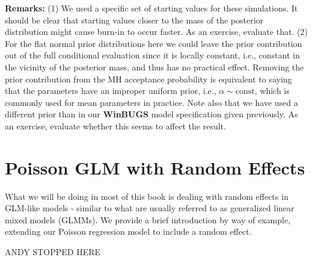 {\bf Remarks:} (1) We used a specific set of starting values for these
simulations. It should be clear that starting values closer to the
mass of the posterior distribution might cause burn-in to occur
faster. As an exercise, evaluate that.  
(2) For the flat normal prior distributions
here we could leave the prior contribution out of the full conditional
evaluation since it is locally constant, i.e., constant in the vicinity of
the posterior mass, and thus has no practical effect. Removing the
prior contribution from the MH acceptance probability is equivalent to
saying that the parameters have an improper uniform prior, i.e.,
$\alpha \sim \mbox{const}$, which is commonly used for mean parameters
in practice.
Note also that we have
used a different prior than in our {\bf WinBUGS} model specification
given previously. As an
exercise, evaluate whether this seems to affect the result.

\section{Poisson GLM with Random Effects}

What we will be doing in most of this book is dealing with random
effects in GLM-like models - similar to what
are usually referred to as generalized
linear mixed models (GLMMs). We provide a brief introduction by way of
example, extending our Poisson regression model to include a random effect.

ANDY STOPPED HERE

